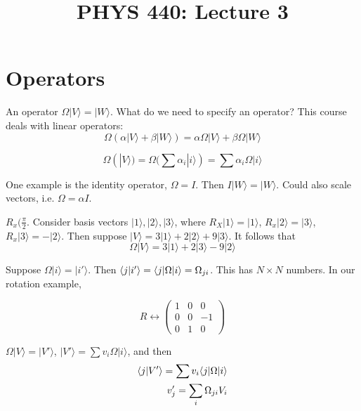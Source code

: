\documentclass[11pt]{scrartcl}
\begin{document}
\title{PHYS 440: Lecture 3}
\maketitle

\section{Operators}

An operator $ \Omega |V \rangle  = |W \rangle  $. What do we need to specify an operator? This course deals with linear operators: 
\begin{equation}
	\Omega(\alpha |V \rangle  + \beta |W \rangle ) = \alpha \Omega |V \rangle  + \beta \Omega |W \rangle 
\end{equation}

\begin{equation}
	\Omega ( |V \rangle ) = \Omega ( \sum \alpha_i |i \rangle ) = \sum \alpha_i \Omega |i \rangle 
\end{equation}

One example is the identity operator, $ \Omega = I $. Then $ I |W \rangle  = |W \rangle  $. Could also scale vectors, i.e. $ \Omega = \alpha I $. 

\begin{example}
	[Rotation]
	$ R_x( \frac{ \pi }{ 2 }  $. Consider basis vectors $ |1 \rangle , |2 \rangle , |3 \rangle  $, where $ R_X |1 \rangle  = |1 \rangle  $, $ R_x |2 \rangle = |3 \rangle  $, $ R_x |3 \rangle  = - |2 \rangle  $. Then suppose $ |V \rangle  = 3 |1 \rangle + 2 |2 \rangle  + 9  |3 \rangle  $. It follows that
	\begin{equation}
		\Omega |V \rangle  = 3 |1 \rangle  + 2 |3 \rangle - 9 |2 \rangle 
	\end{equation}
\end{example}

Suppose $ \Omega |i \rangle  = |i' \rangle  $. Then $ \braket{j|i'} = \langle j | \Omega |i \rangle = \Omega _{ji}  $. This has $ N \times N $ numbers. In our rotation example,

\begin{equation}
	R \leftrightarrow \begin{pmatrix}
		1 & 0 & 0 \\ 0 & 0 & -1 \\ 0 & 1  & 0
	\end{pmatrix} 
\end{equation}

$ \Omega |V \rangle  = |V' \rangle  $, $ |V' \rangle = \sum v_i \Omega |i \rangle  $, and then
\begin{align}
\braket{j|V'} = \sum v_i \langle j | \Omega |i \rangle \\
v_j' = \sum_i \Omega _{ji} V_i
\end{align}
\end{document}
